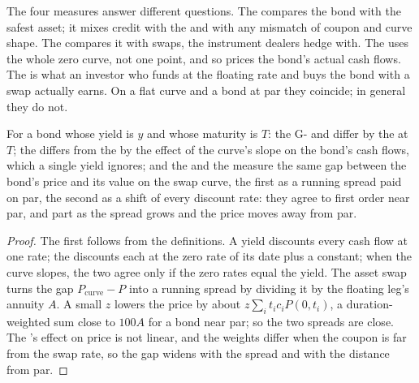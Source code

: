 The four measures answer different questions. The  compares the bond with
the safest asset; it mixes credit with the  and with any mismatch of
coupon and curve shape. The  compares it with swaps, the instrument dealers
hedge with. The  uses the whole zero curve, not one point, and so prices
the bond's actual cash flows. The  is what an investor who funds
at the floating rate and buys the bond with a swap actually earns. On a flat curve
and a bond at par they coincide; in general they do not.

\begin{proposition}\label{prop:m2:corporate-bonds:differ}
For a bond whose yield is $y$ and whose maturity is $T$: the G- and  differ
by the  at $T$; the  differs from the  by the effect of
the curve's slope on the bond's cash flows, which a single yield ignores; and the
 and the  measure the same gap between the bond's price
and its value on the swap curve, the first as a running spread paid on par, the
second as a shift of every discount rate: they agree to first order near par, and
part as the spread grows and the price moves away from par.
\end{proposition}

\begin{proof}
The first follows from the definitions. A yield discounts every cash flow at one
rate; the  discounts each at the zero rate of its date plus a constant;
when the curve slopes, the two agree only if the zero rates equal the yield.
The asset swap turns the gap $P_{\mathrm{curve}} - P$ into a running spread by
dividing it by the floating leg's annuity $A$. A small  $z$ lowers the price
by about $z\sum_i t_i c_i P(0,t_i)$, a duration-weighted sum close to $100A$ for a
bond near par; so the two spreads are close. The 's effect on price is not
linear, and the weights differ when the coupon is far from the swap rate, so the gap
widens with the spread and with the distance from par.
\end{proof}

